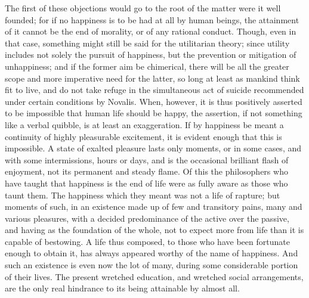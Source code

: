 The first of these objections would go to the root of the matter were
it well founded; for if no happiness is to be had at all by human
beings, the attainment of it cannot be the end of morality, or of any
rational conduct. Though, even in that case, something might still be
said for the utilitarian theory; since utility includes not solely the
pursuit of happiness, but the prevention or mitigation of unhappiness;
and if the former aim be chimerical, there will be all the greater
scope and more imperative need for the latter, so long at least as
mankind think fit to live, and do not take refuge in the simultaneous
act of suicide recommended under certain conditions by Novalis. When,
however, it is thus positively asserted to be impossible that human
life should be happy, the assertion, if not something like a verbal
quibble, is at least an exaggeration. If by happiness be meant a
continuity of highly pleasurable excitement, it is evident enough that
this is impossible. A state of exalted pleasure lasts only moments, or
in some cases, and with some intermissions, hours or days, and is the
occasional brilliant flash of enjoyment, not its permanent and steady
flame. Of this the philosophers who have taught that happiness is the
end of life were as fully aware as those who taunt them. The happiness
which they meant was not a life of rapture; but moments of such, in an
existence made up of few and transitory pains, many and various
pleasures, with a decided predominance of the active over the passive,
and having as the foundation of the whole, not to expect more from
life than it is capable of  bestowing. A life thus composed,
to those who have been fortunate enough to obtain it, has always
appeared worthy of the name of happiness. And such an existence is
even now the lot of many, during some considerable portion of their
lives. The present wretched education, and wretched social
arrangements, are the only real hindrance to its being attainable by
almost all.

